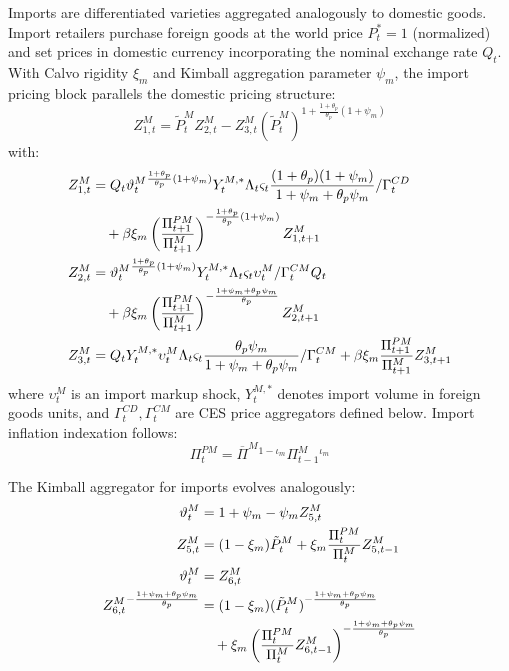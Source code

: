 \documentclass[12pt]{article}
\begin{document}
Imports are differentiated varieties aggregated analogously to domestic goods. Import retailers purchase foreign goods at the world price $P_t^* = 1$ (normalized) and set prices in domestic currency incorporating the nominal exchange rate $Q_t$. With Calvo rigidity $\xi_m$ and Kimball aggregation parameter $\psi_m$, the import pricing block parallels the domestic pricing structure:
\begin{equation}
Z_{1,t}^M = \tilde{P}_t^M Z_{2,t}^M - Z_{3,t}^M (\tilde{P}_t^M)^{1 + \frac{1+\theta_p}{\theta_p}(1+\psi_m)}
\end{equation}
with:
\begin{align}
Z_{1,t}^M &= Q_t \vartheta_t^M {}^{\frac{1+\theta_p}{\theta_p}(1+\psi_m)} Y_t^{M,*} \Lambda_t \varsigma_t \frac{(1+\theta_p)(1+\psi_m)}{1+\psi_m+\theta_p\psi_m} / \Gamma_t^{CD} \notag \\
&\quad + \beta \xi_m \left( \frac{\Pi_{t+1}^{PM}}{\Pi_{t+1}^M} \right)^{-\frac{1+\theta_p}{\theta_p}(1+\psi_m)} Z_{1,t+1}^M \\
Z_{2,t}^M &= \vartheta_t^M {}^{\frac{1+\theta_p}{\theta_p}(1+\psi_m)} Y_t^{M,*} \Lambda_t \varsigma_t \upsilon_t^M / \Gamma_t^{CM} Q_t \notag \\
&\quad + \beta \xi_m \left( \frac{\Pi_{t+1}^{PM}}{\Pi_{t+1}^M} \right)^{-\frac{1+\psi_m+\theta_p\psi_m}{\theta_p}} Z_{2,t+1}^M \\
Z_{3,t}^M &= Q_t Y_t^{M,*} \upsilon_t^M \Lambda_t \varsigma_t \frac{\theta_p \psi_m}{1+\psi_m+\theta_p\psi_m} / \Gamma_t^{CM} + \beta \xi_m \frac{\Pi_{t+1}^{PM}}{\Pi_{t+1}^M} Z_{3,t+1}^M
\end{align}
where $\upsilon_t^M$ is an import markup shock, $Y_t^{M,*}$ denotes import volume in foreign goods units, and $\Gamma_t^{CD}, \Gamma_t^{CM}$ are CES price aggregators defined below. Import inflation indexation follows:
\begin{equation}
\Pi_t^{PM} = \overline{\Pi}^M {}^{1-\iota_m} \Pi_{t-1}^M {}^{\iota_m}
\end{equation}

The Kimball aggregator for imports evolves analogously:
\begin{align}
\vartheta_t^M &= 1 + \psi_m - \psi_m Z_{5,t}^M \\
Z_{5,t}^M &= (1-\xi_m) \tilde{P}_t^M + \xi_m \frac{\Pi_t^{PM}}{\Pi_t^M} Z_{5,t-1}^M \\
\vartheta_t^M &= Z_{6,t}^M \\
Z_{6,t}^M {}^{-\frac{1+\psi_m+\theta_p\psi_m}{\theta_p}} &= (1-\xi_m) (\tilde{P}_t^M)^{-\frac{1+\psi_m+\theta_p\psi_m}{\theta_p}} \notag \\
&\quad + \xi_m \left( \frac{\Pi_t^{PM}}{\Pi_t^M} Z_{6,t-1}^M \right)^{-\frac{1+\psi_m+\theta_p\psi_m}{\theta_p}}
\end{align}
\end{document}
